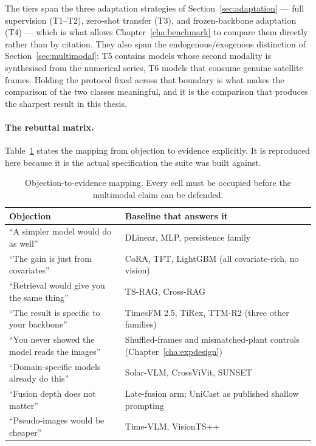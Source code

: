 The tiers span the three adaptation strategies of Section~\ref{sec:adaptation} --- full
supervision (T1--T2), zero-shot transfer (T3), and frozen-backbone adaptation (T4) --- which
is what allows Chapter~\ref{cha:benchmark} to compare them directly rather than by
citation. They also span the endogenous/exogenous distinction of
Section~\ref{sec:multimodal}: T5 contains models whose second modality is synthesised from
the numerical series, T6 models that consume genuine satellite frames. Holding the protocol
fixed across that boundary is what makes the comparison of the two classes meaningful, and
it is the comparison that produces the sharpest result in this thesis.

\paragraph{The rebuttal matrix.} Table~\ref{tab:rebuttal} states the mapping from objection
to evidence explicitly. It is reproduced here because it is the actual specification the
suite was built against.

\begin{table}[h!]
\centering
\small
\begin{tabular}{p{6.2cm} p{7.4cm}}
\hline
\textbf{Objection} & \textbf{Baseline that answers it} \\
\hline
``A simpler model would do as well'' & DLinear, MLP, persistence family \\
``The gain is just from covariates'' & CoRA, TFT, LightGBM (all covariate-rich, no vision) \\
``Retrieval would give you the same thing'' & TS-RAG, Cross-RAG \\
``The result is specific to your backbone'' & TimesFM 2.5, TiRex, TTM-R2 (three other
families) \\
``You never showed the model reads the images'' & Shuffled-frames and mismatched-plant
controls (Chapter~\ref{cha:expdesign}) \\
``Domain-specific models already do this'' & Solar-VLM, CrossViVit, SUNSET \\
``Fusion depth does not matter'' & Late-fusion arm; UniCast as published shallow prompting \\
``Pseudo-images would be cheaper'' & Time-VLM, VisionTS++ \\
\hline
\end{tabular}
\caption{Objection-to-evidence mapping. Every cell must be occupied before the multimodal
claim can be defended.}
\label{tab:rebuttal}
\end{table}

